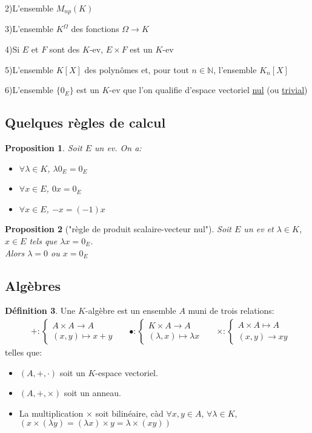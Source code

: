 \documentclass[10pt,a4paper]{article}
\theoremstyle{plain}
\newtheorem{proposition}{Proposition}[section]
\theoremstyle{definition}
\newtheorem{definition}[proposition]{Définition}
\begin{document}
2)L'ensemble $M_{np}(K)$

3)L'ensemble $K^\Omega$ des fonctions $\Omega \to K$

4)Si $E$ et $F$ sont des $K$-ev, $E \times F$ est un $K$-ev

5)L'ensemble $K[X]$ des polynômes et, pour tout $n \in \mathbb{N}$, l'ensemble $K_n[X]$

6)L'ensemble $\{0_E\}$ est un $K$-ev que l'on qualifie d'espace vectoriel \uline{nul} (ou \uline{trivial})

\subsection{Quelques règles de calcul}
\begin{proposition}
Soit $E$ un ev.
On a:
\begin{itemize}
\item $\forall \lambda \in K$, $\lambda 0_E = 0_E$
\item $\forall x \in E$, $0x = 0_E$
\item $\forall x \in E$, $-x = (-1)x$
\end{itemize}
\end{proposition}
\begin{proposition}["règle de produit scalaire-vecteur nul"]
Soit $E$ un ev et $\lambda \in K$, $x \in E$ tels que $\lambda x = 0_E$. \\
Alors $\lambda = 0$ ou $x = 0_E$
\end{proposition}

\pagebreak

\subsection{Algèbres}
\begin{definition}
Une $K$-algèbre est un ensemble $A$ muni de trois relations:
\begin{align*}
&+: \begin{cases}
A \times A \to A \\
(x, y) \mapsto x + y
\end{cases}
&
&\bullet: \begin{cases}
K \times A \to A \\
(\lambda, x) \mapsto \lambda x
\end{cases}
&
&\times: \begin{cases}
A \times A \mapsto A \\
(x, y) \to xy
\end{cases}
\end{align*}
telles que:
\begin{itemize}
\item $(A, +, \cdot)$ soit un $K$-espace vectoriel.
\item $(A, +, \times)$ soit un anneau.
\item La multiplication $\times$ soit bilinéaire, càd $\forall x, y \in A$, $\forall \lambda \in K$, $(x \times (\lambda y) = (\lambda x) \times y = \lambda \times (x y))$
\end{itemize}
\end{definition}
\end{document}
